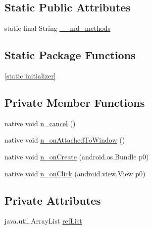 \subsection*{Static Public Attributes}
\begin{CompactItemize}
\item 
static final String \hyperlink{classmd5b60ffeb829f638581ab2bb9b1a7f4f3f_1_1_action_sheet_renderer_ba5845659bc7d9990f99b9029736fd0b}{\_\-\_\-md\_\-methods}
\end{CompactItemize}
\subsection*{Static Package Functions}
\begin{CompactItemize}
\item 
\hyperlink{classmd5b60ffeb829f638581ab2bb9b1a7f4f3f_1_1_action_sheet_renderer_f102e64a6536d7f4911d1ffc1c481a56}{\mbox{[}static initializer\mbox{]}}
\end{CompactItemize}
\subsection*{Private Member Functions}
\begin{CompactItemize}
\item 
native void \hyperlink{classmd5b60ffeb829f638581ab2bb9b1a7f4f3f_1_1_action_sheet_renderer_c90962e4fb27e583722acfcfedf93773}{n\_\-cancel} ()
\item 
native void \hyperlink{classmd5b60ffeb829f638581ab2bb9b1a7f4f3f_1_1_action_sheet_renderer_534117b5eec6c3d13772de9722034487}{n\_\-onAttachedToWindow} ()
\item 
native void \hyperlink{classmd5b60ffeb829f638581ab2bb9b1a7f4f3f_1_1_action_sheet_renderer_35d5cd85a9614eb016e5c4c4db53d36d}{n\_\-onCreate} (android.os.Bundle p0)
\item 
native void \hyperlink{classmd5b60ffeb829f638581ab2bb9b1a7f4f3f_1_1_action_sheet_renderer_c3856bef0046ab9e177ae6c8297e493c}{n\_\-onClick} (android.view.View p0)
\end{CompactItemize}
\subsection*{Private Attributes}
\begin{CompactItemize}
\item 
java.util.ArrayList \hyperlink{classmd5b60ffeb829f638581ab2bb9b1a7f4f3f_1_1_action_sheet_renderer_78f781206c2fbe428d26569e6da13553}{refList}
\end{CompactItemize}


